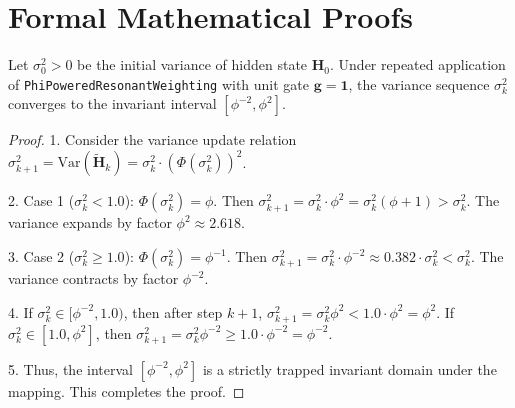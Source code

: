 \section{Formal Mathematical Proofs}

\begin{theorem}
Let $\sigma_0^2 > 0$ be the initial variance of hidden state $\mathbf{H}_0$. Under repeated application of \texttt{PhiPoweredResonantWeighting} with unit gate $\mathbf{g} = \mathbf{1}$, the variance sequence $\sigma_k^2$ converges to the invariant interval $[\phi^{-2}, \phi^2]$.
\end{theorem}

\begin{proof}
1. Consider the variance update relation $\sigma_{k+1}^2 = \text{Var}(\tilde{\mathbf{H}}_k) = \sigma_k^2 \cdot (\Phi(\sigma_k^2))^2$.

2. Case 1 ($\sigma_k^2 < 1.0$): $\Phi(\sigma_k^2) = \phi$. Then $\sigma_{k+1}^2 = \sigma_k^2 \cdot \phi^2 = \sigma_k^2 (\phi + 1) > \sigma_k^2$. The variance expands by factor $\phi^2 \approx 2.618$.

3. Case 2 ($\sigma_k^2 \ge 1.0$): $\Phi(\sigma_k^2) = \phi^{-1}$. Then $\sigma_{k+1}^2 = \sigma_k^2 \cdot \phi^{-2} \approx 0.382 \cdot \sigma_k^2 < \sigma_k^2$. The variance contracts by factor $\phi^{-2}$.

4. If $\sigma_k^2 \in [\phi^{-2}, 1.0)$, then after step $k+1$, $\sigma_{k+1}^2 = \sigma_k^2 \phi^2 < 1.0 \cdot \phi^2 = \phi^2$. If $\sigma_k^2 \in [1.0, \phi^2]$, then $\sigma_{k+1}^2 = \sigma_k^2 \phi^{-2} \ge 1.0 \cdot \phi^{-2} = \phi^{-2}$.

5. Thus, the interval $[\phi^{-2}, \phi^2]$ is a strictly trapped invariant domain under the mapping. This completes the proof.
\end{proof}